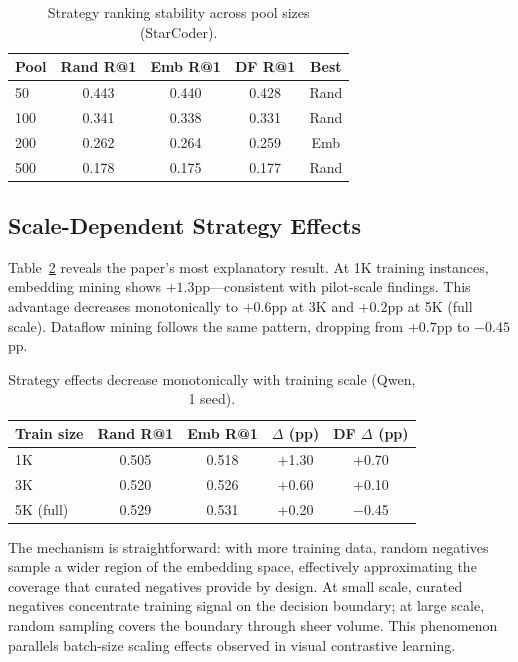 \documentclass[11pt,a4paper]{article}
\begin{document}
\begin{table}[t]
\centering
\caption{Strategy ranking stability across pool sizes (StarCoder).}
\label{tab:pool_sc}
\small
\begin{tabular}{lcccc}
\toprule
\textbf{Pool} & \textbf{Rand R@1} & \textbf{Emb R@1} & \textbf{DF R@1} & \textbf{Best} \\
\midrule
50 & 0.443 & 0.440 & 0.428 & Rand \\
100 & 0.341 & 0.338 & 0.331 & Rand \\
200 & 0.262 & 0.264 & 0.259 & Emb \\
500 & 0.178 & 0.175 & 0.177 & Rand \\
\bottomrule
\end{tabular}
\end{table}

\subsection{Scale-Dependent Strategy Effects}
\label{sec:scale}

Table~\ref{tab:scale} reveals the paper's most explanatory result.
At 1K training instances, embedding mining shows $+1.3$pp---consistent with pilot-scale findings.
This advantage decreases monotonically to $+0.6$pp at 3K and $+0.2$pp at 5K (full scale).
Dataflow mining follows the same pattern, dropping from $+0.7$pp to $-0.45$pp.

\begin{table}[t]
\centering
\caption{Strategy effects decrease monotonically with training scale (Qwen, 1 seed).}
\label{tab:scale}
\small
\begin{tabular}{lcccc}
\toprule
\textbf{Train size} & \textbf{Rand R@1} & \textbf{Emb R@1} & \textbf{$\Delta$ (pp)} & \textbf{DF $\Delta$ (pp)} \\
\midrule
1K & 0.505 & 0.518 & +1.30 & +0.70 \\
3K & 0.520 & 0.526 & +0.60 & +0.10 \\
5K (full) & 0.529 & 0.531 & +0.20 & $-$0.45 \\
\bottomrule
\end{tabular}
\end{table}

The mechanism is straightforward: with more training data, random negatives sample a wider region of the embedding space, effectively approximating the coverage that curated negatives provide by design.
At small scale, curated negatives concentrate training signal on the decision boundary; at large scale, random sampling covers the boundary through sheer volume.
This phenomenon parallels batch-size scaling effects observed in visual contrastive learning.
\end{document}
